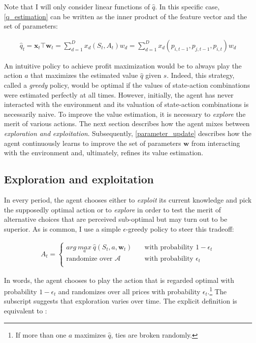 Note that I will only consider linear functions of $\hat{q}$. In this specific case, \autoref{q_estimation} can be written as the inner product of the feature vector and the set of parameters:

\begin{gather}\label{q_estimation_linear}
\hat{q}_t = \boldsymbol{x}_t \top \boldsymbol{w}_t = \sum_{d=1}^{D} x_d(S_t, A_t) w_d = \sum_{d=1}^{D} x_d(p_{i, t-1}, p_{j, t-1}, p_{i, t}) w_d
\end{gather}

An intuitive policy to achieve profit maximization would be to always play the action $a$ that maximizes the estimated value $\hat{q}$ given $s$. Indeed, this strategy, called a \emph{greedy} policy, would be optimal if the values of state-action combinations were estimated perfectly at all times. However, initially, the agent has never interacted with the environment and its valuation of state-action combinations is necessarily naive. To improve the value estimation, it is necessary to \emph{explore} the merit of various actions. The next section describes how the agent mixes between \emph{exploration and exploitation}. Subsequently, \autoref{parameter_update} describes how the agent continuously learns to improve the set of parameters $\boldsymbol{w}$ from interacting with the environment and, ultimately, refines its value estimation.

\subsection{Exploration and exploitation} 
In every period, the agent chooses either to \emph{exploit} its current knowledge and pick the supposedly optimal action or to \emph{explore} in order to test the merit of alternative choices that are perceived sub-optimal but may turn out to be superior. As is common, I use a simple $\epsilon$-greedy policy to steer this tradeoff:

\begin{gather}\label{action_selection}
 A_t = \begin{cases} arg ~\underset{a}{max} ~ \hat{q}(S_t,a,\boldsymbol{w}_t) & \quad \text{with probability } 1 - \epsilon_t\\
\text{randomize over } \mathcal{A} & \quad \text{with probability } \epsilon_t\\ \end{cases} 
\end{gather}

In words, the agent chooses to play the action that is regarded optimal with probability $1-\epsilon_t$ and randomizes over all prices with probability $\epsilon_t$.\footnote{If more than one $a$ maximizes $\hat{q}$, ties are broken randomly.} The subscript suggests that exploration varies over time. The explicit definition is equivalent to \textcite[p.3274]{calvano_artificial_2020}:

